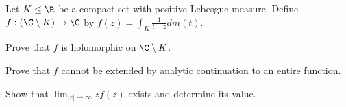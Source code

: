Let $K\leq \R$ be a compact set with positive Lebesgue measure. Define
$f:(\C\setminus K)\rightarrow \C$ by $f(z)=\int_K\frac{1}{t-z}dm(t)$.
\begin{alist}
\item Prove that $f$ is holomorphic on $\C\setminus K$.
\item Prove that $f$ cannot be extended by analytic continuation to an
entire function.
\item Show that $\lim_{|z|\rightarrow \infty}zf(z)$ exists and
determine its value.
\end{alist}
